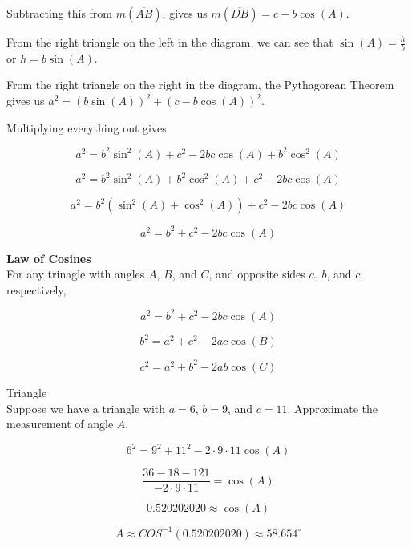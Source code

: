 \documentclass{ximera}
\begin{document}
Subtracting this from $m(\overline{AB})$, gives us $m(\overline{DB}) = c - b \cos(A)$.


From the right triangle on the left in the diagram, we can see that $\sin(A) = \frac{h}{b}$ or $h = b \sin(A)$.




From the right triangle on the right in the diagram, the Pythagorean Theorem gives us $a^2 = (b \sin(A))^2 + (c - b \cos(A))^2$.


Multiplying everything out gives


\[    a^2 = b^2 \sin^2(A) +  c^2  - 2 b c \cos(A) + b^2 \cos^2(A)  \]


\[    a^2 = b^2 \sin^2(A) + b^2 \cos^2(A) +  c^2  - 2 b c \cos(A)   \]


\[    a^2 = b^2 (\sin^2(A) + \cos^2(A)) +  c^2  - 2 b c \cos(A)   \]


\[    a^2 = b^2  +  c^2  - 2 b c \cos(A)   \]












\begin{theorem}  \textbf{\textcolor{green!50!black}{Law of Cosines}}  \\



For any trinagle with angles $A$, $B$, and $C$, and opposite sides $a$, $b$, and $c$, respectively, 


\[    a^2 = b^2  +  c^2  - 2 b c \cos(A)   \]

\[    b^2 = a^2  +  c^2  - 2 a c \cos(B)   \]

\[    c^2 = a^2  +  b^2  - 2 a b \cos(C)   \]


\end{theorem}










\begin{example} Triangle \\

Suppose we have a triangle with $a=6$, $b=9$, and $c=11$. Approximate the measurement of angle $A$.

\[    6^2 = 9^2  +  11^2  - 2 \cdot 9 \cdot 11 \cos(A)   \]


\[    \frac{36 - 18 - 121}{- 2 \cdot 9 \cdot 11} =    \cos(A)   \]

\[  0.520202020 \approx \cos(A)  \]


\[ A \approx COS^{-1}(0.520202020)  \approx 58.654^{\circ}   \]


\end{example}
\end{document}
